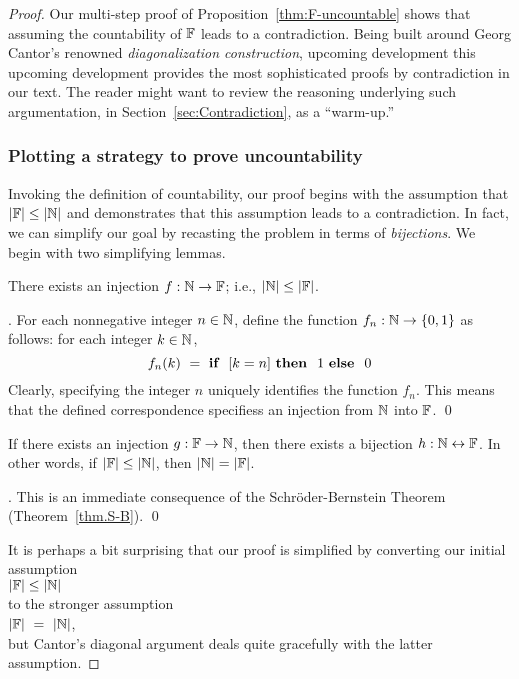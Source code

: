 \begin{proof}
Our multi-step proof of Proposition~\ref{thm:F-uncountable} shows that
assuming the countability of $\mathbb{F}$ leads to a contradiction.  Being
built around Georg Cantor's renowned {\it diagonalization
  construction}, upcoming development
 this upcoming development provides
the most sophisticated proofs by contradiction in our text.  The
reader might want to review the reasoning underlying such
argumentation, in Section~\ref{sec:Contradiction}, as a ``warm-up.''

\subsubsection{Plotting a strategy to prove uncountability}
\label{sec:the-diag-strategy}

Invoking the definition of countability, our proof begins with the
assumption that $|\mathbb{F}| \leq |\mathbb{N}|$ and demonstrates that this assumption
leads to a contradiction.  In fact, we can simplify our goal by
recasting the problem in terms of {\em bijections}.  We begin with two
simplifying lemmas.

\begin{lemma}
\label{lem:N-leq-F}
There exists an injection $f: \mathbb{N} \rightarrow \mathbb{F}$; i.e., $|\mathbb{N}| \leq
|\mathbb{F}|$.
\end{lemma}

.
For each nonnegative integer $n \in \mathbb{N}$, define the function $f_n: \mathbb{N}
\rightarrow \{0,1\}$ as follows: for each integer $k \in \mathbb{N}$,
\[ f_n(k) \ = \ \mbox{\bf if } \ [k=n] \ \mbox{\bf then } \ 1
\ \mbox{\bf else } \ 0
\]
Clearly, specifying the integer $n$ uniquely identifies the function
$f_n$.  This means that the defined correspondence specifiess an
injection from $\mathbb{N}$ into $\mathbb{F}$.  \qed

\begin{lemma}
\label{lem:N-=-F}
If there exists an injection $g: \mathbb{F} \rightarrow \mathbb{N}$, then there exists
a bijection $h: \mathbb{N} \leftrightarrow \mathbb{F}$.  In other words, if $|\mathbb{F}| \leq
|\mathbb{N}|$, then $|\mathbb{N}| = |\mathbb{F}|$.
\end{lemma}

.
This is an immediate consequence of the Schr\"{o}der-Bernstein Theorem
(Theorem~\ref{thm.S-B}).  \qed

\medskip

It is perhaps a bit surprising that our proof is simplified by
converting our initial assumption \\
\hspace*{.35in}$|\mathbb{F}| \leq |\mathbb{N}|$ \\
to the stronger assumption \\
\hspace*{.35in}$|\mathbb{F}| \ = \ |\mathbb{N}|$,  \\
but Cantor's diagonal argument deals quite gracefully with the latter
assumption.


\end{proof}
